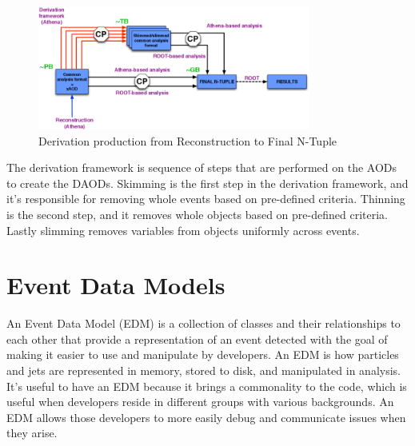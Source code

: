 \begin{figure}[h]
    \centering
    \includegraphics[width=0.8\textwidth]{content/img/catmore-derivation.png}
    \caption{Derivation production from Reconstruction to Final N-Tuple\cite{DAOD_Laycock_2014}}
    \label{fig:IO_derivation_framework}
\end{figure}

The derivation framework is sequence of steps that are performed on the AODs to create the DAODs.
Skimming is the first step in the derivation framework, and it's responsible for removing whole events based on pre-defined criteria.
Thinning is the second step, and it removes whole objects based on pre-defined criteria.
Lastly slimming removes variables from objects uniformly across events. 


\section{Event Data Models} \label{sec:IO_EDM}
An Event Data Model (EDM) is a collection of classes and their relationships to each other that provide a representation of an event detected with the goal of making it easier to use and manipulate by developers.
An EDM is how particles and jets are represented in memory, stored to disk, and manipulated in analysis.
It's useful to have an EDM because it brings a commonality to the code, which is useful when developers reside in different groups with various backgrounds.
An EDM allows those developers to more easily debug and communicate issues when they arise.  

